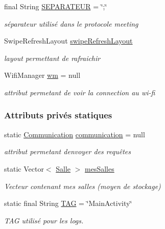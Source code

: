 \begin{DoxyCompactItemize}
final String \hyperlink{classcom_1_1lasalle_1_1meeting_1_1_main_activity_a44e95026afeb6899f23283db298f94c9}{S\+E\+P\+A\+R\+A\+T\+E\+UR} = \char`\"{};\char`\"{}
\begin{DoxyCompactList}\small\item\em séparateur utilisé dans le protocole meeting \end{DoxyCompactList}\item 
Swipe\+Refresh\+Layout \hyperlink{classcom_1_1lasalle_1_1meeting_1_1_main_activity_a8feba36a47aa90a06a1df709d24799ec}{swipe\+Refresh\+Layout}
\begin{DoxyCompactList}\small\item\em layout permettant de rafraichir \end{DoxyCompactList}\item 
Wifi\+Manager \hyperlink{classcom_1_1lasalle_1_1meeting_1_1_main_activity_ae7f6d13e941fdf4d6147df3a79e1aa22}{wm} = null
\begin{DoxyCompactList}\small\item\em attribut permetant de voir la connection au wi-\/fi \end{DoxyCompactList}\end{DoxyCompactItemize}
\subsubsection*{Attributs privés statiques}
\begin{DoxyCompactItemize}
\item 
static \hyperlink{classcom_1_1lasalle_1_1meeting_1_1_communication}{Communication} \hyperlink{classcom_1_1lasalle_1_1meeting_1_1_main_activity_a6a358d10ba0f56af3b548e41902db273}{communication} = null
\begin{DoxyCompactList}\small\item\em attribut permetant d\textquotesingle{}envoyer des requêtes \end{DoxyCompactList}\item 
static Vector$<$ \hyperlink{classcom_1_1lasalle_1_1meeting_1_1_salle}{Salle} $>$ \hyperlink{classcom_1_1lasalle_1_1meeting_1_1_main_activity_ab13e34516d877abc3ba937505b441979}{mes\+Salles}
\begin{DoxyCompactList}\small\item\em Vecteur contenant mes salles (moyen de stockage) \end{DoxyCompactList}\item 
static final String \hyperlink{classcom_1_1lasalle_1_1meeting_1_1_main_activity_a8f934680ad3a7ec4ad0fea748f0b7506}{T\+AG} = \char`\"{}Main\+Activity\char`\"{}
\begin{DoxyCompactList}\small\item\em T\+AG utilisé pour les logs. \end{DoxyCompactList}\end{DoxyCompactItemize}


